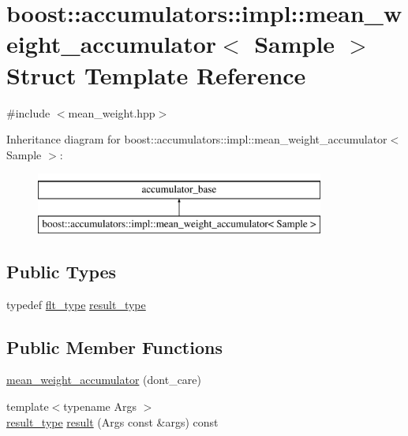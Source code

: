\hypertarget{structboost_1_1accumulators_1_1impl_1_1mean__weight__accumulator}{}\section{boost\+:\+:accumulators\+:\+:impl\+:\+:mean\+\_\+weight\+\_\+accumulator$<$ Sample $>$ Struct Template Reference}
\label{structboost_1_1accumulators_1_1impl_1_1mean__weight__accumulator}


{\ttfamily \#include $<$mean\+\_\+weight.\+hpp$>$}

Inheritance diagram for boost\+:\+:accumulators\+:\+:impl\+:\+:mean\+\_\+weight\+\_\+accumulator$<$ Sample $>$\+:\begin{figure}[H]
\begin{center}
\leavevmode
\includegraphics[height=2.000000cm]{structboost_1_1accumulators_1_1impl_1_1mean__weight__accumulator}
\end{center}
\end{figure}
\subsection*{Public Types}
\begin{DoxyCompactItemize}
\item 
typedef \hyperlink{lib_2IceBRG__main_2common_8h_ad0f130a56eeb944d9ef2692ee881ecc4}{flt\+\_\+type} \hyperlink{structboost_1_1accumulators_1_1impl_1_1mean__weight__accumulator_aa801a0036d51f922b4ac392309a2ca37}{result\+\_\+type}
\end{DoxyCompactItemize}
\subsection*{Public Member Functions}
\begin{DoxyCompactItemize}
\item 
\hyperlink{structboost_1_1accumulators_1_1impl_1_1mean__weight__accumulator_a0aa2176eab9ce6eec07f8eca2e29922d}{mean\+\_\+weight\+\_\+accumulator} (dont\+\_\+care)
\item 
{\footnotesize template$<$typename Args $>$ }\\\hyperlink{structboost_1_1accumulators_1_1impl_1_1mean__weight__accumulator_aa801a0036d51f922b4ac392309a2ca37}{result\+\_\+type} \hyperlink{structboost_1_1accumulators_1_1impl_1_1mean__weight__accumulator_a480b0bbb3ad6634179ea7e7e7d4aa7ce}{result} (Args const \&args) const 
\end{DoxyCompactItemize}


